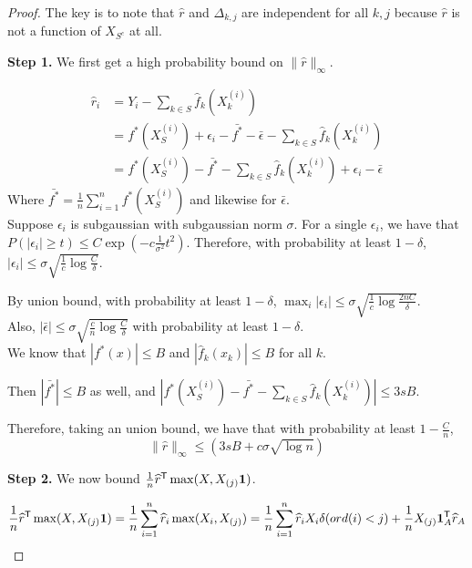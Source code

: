 \documentclass{article}
\begin{document}
\begin{proof}
The key is to note that $\hat{r}$ and $\Delta_{k,j}$ are independent for all $k,j$ because $\hat{r}$ is not a function of $X_{S^c}$ at all.

\textbf{Step 1.} We first get a high probability bound on $\| \hat{r} \|_\infty$. 

\begin{align*}
\hat{r}_i &= Y_i - \sum_{k \in S} \hat{f}_k (X_k^{(i)}) \\
	&= f^*(X_S^{(i)}) + \epsilon_i - \bar{f^*} - \bar{\epsilon}- \sum_{k \in S} \hat{f}_k(X_k^{(i)}) \\
	&=  f^*(X_S^{(i)}) - \bar{f^*} - \sum_{k \in S} \hat{f}_k(X_k^{(i)}) + \epsilon_i - \bar{\epsilon}
\end{align*}
Where $\bar{f^*} = \frac{1}{n} \sum_{i=1}^n f^*(X_S^{(i)})$ and likewise for $\bar{\epsilon}$.\\

Suppose $\epsilon_i$ is subgaussian with subgaussian norm $\sigma$. For a single $\epsilon_i$, we have that $P( |\epsilon_i| \geq t ) \leq C \exp( - c \frac{1}{\sigma^2} t^2)$. Therefore, with probability at least $1-\delta$, $|\epsilon_i| \leq \sigma\sqrt{ \frac{1}{c} \log \frac{C}{\delta}}$. 

By union bound, with probability at least $1-\delta$, $\max_i |\epsilon_i| \leq \sigma \sqrt{ \frac{1}{c} \log \frac{2nC}{\delta}}$.\\

Also, $|\bar{\epsilon}| \leq \sigma \sqrt{\frac{c}{n} \log \frac{C}{\delta}}$ with probability at least $1 - \delta$.\\

We know that $|f^*(x)| \leq B$ and $|\hat{f}_k(x_k)| \leq B$ for all $k$. 

Then $|\bar{f^*}| \leq B$ as well, and $|f^*(X_S^{(i)}) - \bar{f^*} - \sum_{k \in S} \hat{f}_k(X_k^{(i)})| \leq 3s B$.

Therefore, taking an union bound, we have that with probability at least $1-\frac{C}{n}$, 
\[
\| \hat{r} \|_\infty \leq (3 s B + c\sigma\sqrt{\log n}) 
\]


\textbf{Step 2.} We now bound $\frac{1}{n} \widehat{r}^{\mathsf{T}} \max( X, X_{(j)} \mathbf{1})$.

\[
\frac{1}{n} \widehat{r}^{\mathsf{T}} \max(X, X_{(j)} \mathbf{1}) = \frac{1}{n} \sum_{i=1}^n \widehat{r}_i \max(X_i, X_{(j)}) = \frac{1}{n} \sum_{i=1}^n \widehat{r}_i X_i \delta(ord(i) < j) + \frac{1}{n} X_{(j)} \mathbf{1}_A^{\mathsf{T}} \widehat{r}_A
\]


\end{proof}
\end{document}

